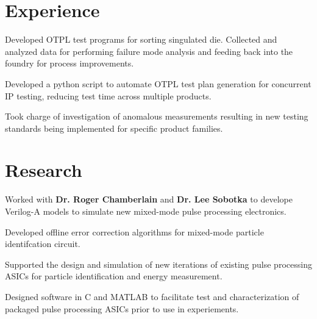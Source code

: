 \documentclass[]{deedy-resume-openfont}
\begin{document}
\begin{minipage}[t]{0.66\textwidth} 


\section{Experience}
\vspace{\topsep} %
\begin{tightemize}
\item Developed OTPL test programs for sorting singulated die. Collected and analyzed data for performing failure mode analysis and feeding back into the foundry for process improvements. 
\item Developed a python script to automate OTPL test plan generation for concurrent IP testing, reducing test time across multiple products.
\item Took charge of investigation of anomalous measurements resulting in new testing standards being implemented for specific product families.
\end{tightemize}
\sectionsep


\section{Research}
\begin{tightemize}
\item Worked with \textbf{Dr. Roger Chamberlain} and \textbf{Dr. Lee Sobotka} to develope Verilog-A models to simulate new mixed-mode pulse processing electronics.
\item Developed offline error correction algorithms for mixed-mode particle identifcation circuit.
\item Supported the design and simulation of new iterations of existing pulse processing ASICs for particle identification and energy measurement.
\item Designed software in C and MATLAB to facilitate test and characterization of packaged pulse processing ASICs prior to use in experiements.
\end{tightemize}
\sectionsep


\end{minipage}
\end{document}
